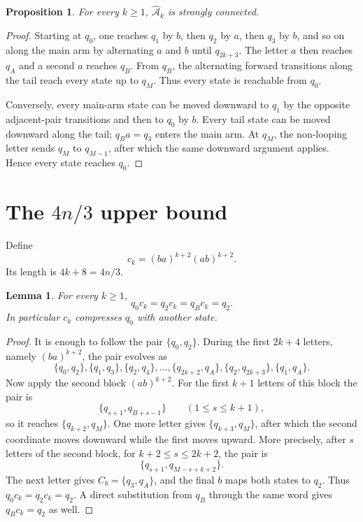 \documentclass[11pt]{article}
\newtheorem{lemma}{Lemma}
\newtheorem{proposition}{Proposition}
\theoremstyle{definition}
\theoremstyle{remark}
\newcommand{\Ahat}{\widehat{\mathcal A}}
\newcommand{\pair}[2]{\{q_{#1},q_{#2}\}}
\begin{document}
\begin{proposition}\label{prop:sc}
For every $k\ge1$, $\Ahat_k$ is strongly connected.
\end{proposition}

\begin{proof}
Starting at $q_0$, one reaches $q_1$ by $b$, then $q_2$ by $a$, then $q_3$ by $b$, and so on along the main arm by alternating $a$ and $b$ until $q_{2k+3}$. The letter $a$ then reaches $q_A$ and a second $a$ reaches $q_B$. From $q_B$, the alternating forward transitions along the tail reach every state up to $q_M$. Thus every state is reachable from $q_0$.

Conversely, every main-arm state can be moved downward to $q_1$ by the opposite adjacent-pair transitions and then to $q_0$ by $b$. Every tail state can be moved downward along the tail; $q_Ba=q_3$ enters the main arm. At $q_M$, the non-looping letter sends $q_M$ to $q_{M-1}$, after which the same downward argument applies. Hence every state reaches $q_0$.
\end{proof}

\section{The $4n/3$ upper bound}
Define
\[
 c_k=(ba)^{k+2}(ab)^{k+2}.
\]
Its length is $4k+8=4n/3$.

\begin{lemma}\label{lem:upper}
For every $k\ge1$,
\[
 q_0c_k=q_2c_k=q_Bc_k=q_2.
\]
In particular $c_k$ compresses $q_0$ with another state.
\end{lemma}

\begin{proof}
It is enough to follow the pair $\pair{0}{2}$. During the first $2k+4$ letters, namely $(ba)^{k+2}$, the pair evolves as
\[
 \pair{0}{2},\pair{1}{3},\pair{2}{4},\ldots,
 \pair{2k+2}{A},\pair{2}{2k+3},\pair{1}{A}.
\]
Now apply the second block $(ab)^{k+2}$. For the first $k+1$ letters of this block the pair is
\[
 \pair{s+1}{B+s-1}\qquad(1\le s\le k+1),
\]
so it reaches $\pair{k+2}{M}$. One more letter gives $\pair{k+3}{M}$, after which the second coordinate moves downward while the first moves upward. More precisely, after $s$ letters of the second block, for $k+2\le s\le2k+2$, the pair is
\[
 \pair{s+1}{M-s+k+2}.
\]
The next letter gives $C_b=\pair{3}{A}$, and the final $b$ maps both states to $q_2$. Thus $q_0c_k=q_2c_k=q_2$. A direct substitution from $q_B$ through the same word gives $q_Bc_k=q_2$ as well.
\end{proof}
\end{document}
